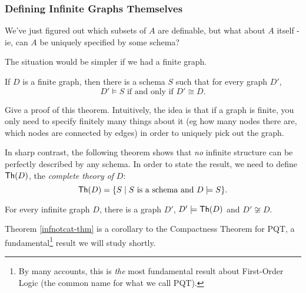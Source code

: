 \subsubsection*{Defining Infinite Graphs Themselves}
We've just figured out which subsets of $A$ are definable, but what about $A$ itself - ie, can $A$ be uniquely specified by some schema?

The situation would be simpler if we had a finite graph.
\begin{theorem}
If $D$ is a finite graph, then there is a schema $S$ such that for every graph $D'$, 
\[
D'\models S \mbox{ if and only if } D'\cong D.
\]
\end{theorem}

\begin{aside}
    Give a proof of this theorem. Intuitively, the idea is that if a graph is finite, you only need to specify finitely many things about it (eg how many nodes there are, which nodes are connected by edges) in order to uniquely pick out the graph. 
\end{aside}

In sharp contrast, the following theorem shows that \emph{no} infinite structure can be perfectly described by any schema. In order to state the result, we need to define $\mbox{${\mathsf{Th}}(D)$}$, the \emph{complete theory of} $D$:
\[
\mbox{${\mathsf{Th}}(D)$} = \{S\mid S \mbox{ is a schema and } D\models S\}. 
\]
\begin{theorem}\label{infnotcat-thm}
For every infinite graph $D$, there is a graph $D'$, $D'\models\mbox{${\mathsf{Th}}(D)$}$ and $D'\not\cong D$.
\end{theorem}
Theorem \ref{infnotcat-thm} is a corollary to the Compactness Theorem for PQT, a fundamental\footnote{By many accounts, this is \emph{the} most fundamental result about First-Order Logic (the common name for what we call PQT).} result we will study shortly.
